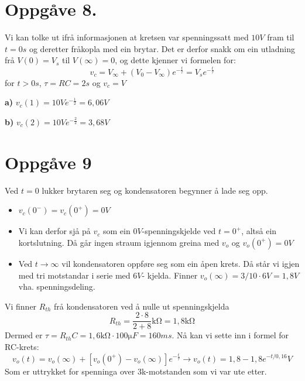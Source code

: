 \documentclass[12pt,a4paper]{article}
\begin{document}
    \section{Oppgåve 8.}
      Vi kan tolke ut ifrå informasjonen at kretsen var spenningssatt med $10V$ fram til
      $t=0s$ og deretter fråkopla med ein brytar. Det er derfor snakk om ein utladning
      frå $V(0) = V_s$ til $V(\infty)=0$, og dette kjenner vi formelen for:
      \begin{equation}
        v_c = V_{\infty} + \left(V_0 - V_{\infty} \right)e^{-\frac{t}{\tau}}
        = V_se^{-\frac{t}{\tau}}
      \end{equation}
      for $t > 0s$, $\tau = RC = 2s$ og $v_c = V$


      \textbf{a)} $v_c(1) = 10Ve^{-\frac{1}{2}} = 6,06V$


      \textbf{b)} $v_c(2) = 10Ve^{-\frac{2}{2}} = 3,68V$

    \section{Oppgåve 9}
      Ved $t=0$ lukker brytaren seg og kondensatoren begynner å lade seg opp.
      \begin{itemize}
        \item $v_c(0^-) = v_c(0^+) = 0V$
        \item Vi kan derfor sjå på $v_c$ som ein $0V$-spenningskjelde ved $t=0^+$,
          altså ein kortslutning. Då går ingen straum igjennom greina med $v_o$
          og $v_o(0^+) = 0V$
        \item Ved $t \rightarrow \infty$ vil kondensatoren oppføre seg som ein
          åpen krets. Då står vi igjen med tri motstandar i serie med $6V$-
          kjelda. Finner $v_o(\infty) = 3/10\cdot6V = 1,8V$ vha. spenningsdeling.
      \end{itemize}
      Vi finner $R_{th}$ frå kondensatoren ved å nulle ut spenningskjelda
      \begin{equation}
        R_{th} = \frac{2\cdot8}{2+8}\si{\kilo\ohm} = 1,8\si{\kilo\ohm}
      \end{equation}
      Dermed er $\tau = R_{th}C = 1,6\si{\kilo\ohm}\cdot 100\si{\micro F} = 160ms$.
      Nå kan vi sette inn i formel for RC-krets:
      \begin{equation}
        v_o(t)=v_o(\infty) + \left[ v_o(0^+)-v_o(\infty)\right] e^{-\frac{t}{\tau}}
        \rightarrow v_o(t) = 1,8 - 1,8e^{-t/0,16}V
      \end{equation}
      Som er uttrykket for spenninga over 3k-motstanden som vi var ute etter.
\end{document}
